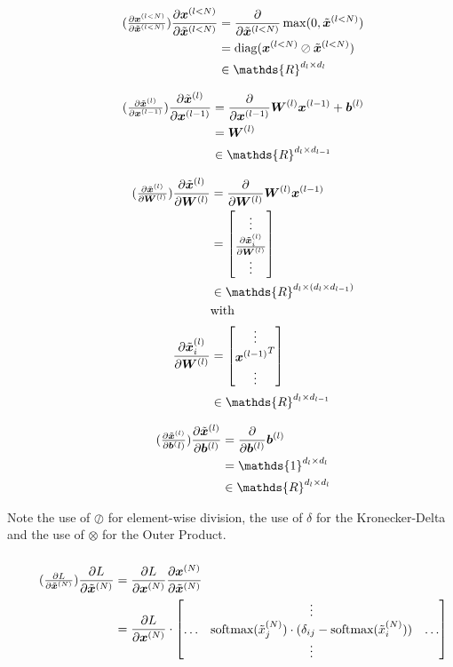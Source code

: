 \documentclass{article}
\newcommand\bM[1]{\ensuremath{\begin{bmatrix}#1\end{bmatrix}}}
\newcommand\·{\ensuremath{\cdot}}
\newcommand\…{\ensuremath{\dots}}
\renewcommand\t{\ensuremath{\times}}
\DeclareMathOperator{\diag}{diag}
\newcommand{\⇔}{\ensuremath{\Leftrightarrow}}
\newcommand{\⇐}{\ensuremath{\Rightarrow}}
\newcommand{\⇒}{\ensuremath{\Leftarrow}}
\newcommand\pf[2]{\ensuremath{\frac{\partial {#1}}{\partial {#2}}}}
\newcommand*{\B}[1]{\ifmmode\bm{#1}\else\textbf{#1}\fi}
\newcommand\1{\ensuremath{\mathds{1}}}
\newcommand\ℝ{\ensuremath{\mathds{R}}}
\begin{document}
\begin{align*}
  \tag{$\pf{\B{x}^{(l<N)}}{\tilde{\B{x}}^{(l<N)}}$}
  \pf{\B{x}^{(l<N)}}{\tilde{\B{x}}^{(l<N)}}
  &= \pf{}{\tilde{\B{x}}^{(l<N)}}\max(0,\tilde{\B{x}}^{(l<N)})\\
  &= \diag(\B{x}^{(l<N)}\oslash\tilde{\B{x}}^{(l<N)})\\
  &\in\ℝ^{d_l\t d_l}
\end{align*}

\begin{align*}
  \tag{$\pf{\tilde{\B{x}}^{(l)}}{\B{x}^{(l-1)}}$}
  \pf{\tilde{\B{x}}^{(l)}}{\B{x}^{(l-1)}}
  &= \pf{}{\B{x}^{(l-1)}} \B{W}^{(l)}\B{x}^{(l-1)} + \B{b}^{(l)}\\
  &=\B{W}^{(l)}\\
  &\in\ℝ^{d_l\t d_{l-1}}
\end{align*}

\begin{align*}
  \tag{$\pf{\tilde{\B{x}}^{(l)}}{\B{W}^{(l)}}$}
  \pf{\tilde{\B{x}}^{(l)}}{\B{W}^{(l)}}
  &= \pf{}{\B{W}^{(l)}}\B{W}^{(l)}\B{x}^{(l-1)}\\
  &= \bM{\vdots\\\pf{\tilde{\B{x}}^{(l)}_i}{\B{W}^{(l)}}\\\vdots}\\
  &\in\ℝ^{d_l\t (d_l\t d_{l-1})}\\
  &\text{with}\\
  \pf{\tilde{\B{x}}^{(l)}_i}{\B{W}^{(l)}}
  &= \bM{\vdots\\{\B{x}^{(l-1)}}^T\\\vdots}\\
  &\in\ℝ^{d_l\t d_{l-1}}
\end{align*}

\begin{align*}
  \tag{$\pf{\tilde{\B{x}}^{(l)}}{\B{b}^(l)}$}
  \pf{\tilde{\B{x}}^{(l)}}{\B{b}^{(l)}}
  &= \pf{}{\B{b}^{(l)}}\B{b}^{(l)}\\
  &= \1^{d_l\t d_l}\\
  &\in\ℝ^{d_l\t d_l}
\end{align*}

Note the use of $\oslash$ for element-wise division, the use of $\delta$ for the Kronecker-Delta and the use of $\otimes$ for the Outer Product.

\subsubsection{}
\begin{align*}
  \tag{$\pf{L}{\tilde{\B{x}}^{(N)}}$}
  \pf{L}{\tilde{\B{x}}^{(N)}}
  &= \pf{L}{\B{x}^{(N)}}\pf{\B{x}^{(N)}}{\tilde{\B{x}}^{(N)}}\\
  &= \pf{L}{\B{x}^{(N)}}\·\bM{& \vdots &\\\hdots & \text{softmax}(\tilde{x}^{(N)}_j)\·(\delta_{ij} - \text{softmax}(\tilde{x}^{(N)}_i)) & \hdots\\ & \vdots &}
\end{align*}
\end{document}
